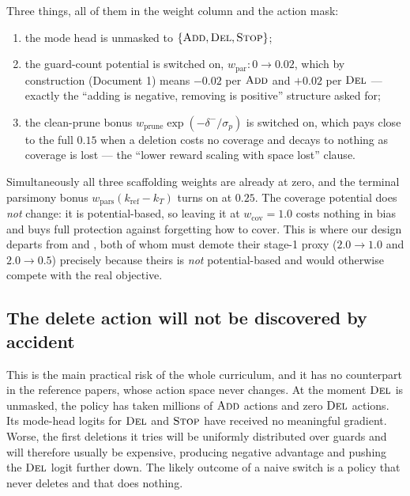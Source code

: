 \documentclass[11pt,a4paper]{article}
\begin{document}
Three things, all of them in the weight column and the action mask:

\begin{enumerate}[label=(\alph*)]
  \item the mode head is unmasked to $\{\textsc{Add}, \textsc{Del}, \textsc{Stop}\}$;
  \item the guard-count potential is switched on, $w_{\mathrm{par}}: 0 \to 0.02$, which by
        construction (Document 1) means $-0.02$ per $\textsc{Add}$ and $+0.02$ per $\textsc{Del}$ --- exactly
        the ``adding is negative, removing is positive'' structure asked for;
  \item the clean-prune bonus $w_{\mathrm{prune}}\exp(-\delta^{-}/\sigma_p)$ is switched on,
        which pays close to the full $0.15$ when a deletion costs no coverage and decays to
        nothing as coverage is lost --- the ``lower reward scaling with space lost'' clause.
\end{enumerate}

Simultaneously all three scaffolding weights are already at zero, and the terminal
parsimony bonus $w_{\mathrm{pars}}(k_{\mathrm{ref}} - k_T)$ turns on at $0.25$.
The coverage potential does \emph{not} change: it is potential-based, so leaving it at
$w_{\mathrm{cov}} = 1.0$ costs nothing in bias and buys full protection against forgetting
how to cover. This is where our design departs from \citet{wang2025dribble} and
\citet{xu2025striker}, both of whom must demote their stage-1 proxy ($2.0 \to 1.0$ and
$2.0 \to 0.5$) precisely because theirs is \emph{not} potential-based and would otherwise
compete with the real objective.

\subsection{The delete action will not be discovered by accident}\label{sec:oracle}

This is the main practical risk of the whole curriculum, and it has no counterpart in the
reference papers, whose action space never changes. At the moment $\textsc{Del}$ is unmasked, the
policy has taken millions of $\textsc{Add}$ actions and zero $\textsc{Del}$ actions. Its mode-head logits
for $\textsc{Del}$ and $\textsc{Stop}$ have received no meaningful gradient. Worse, the first deletions it
tries will be uniformly distributed over guards and will therefore usually be expensive,
producing negative advantage and pushing the $\textsc{Del}$ logit further down. The likely outcome
of a naive switch is a policy that never deletes and \stageII{} that does nothing.
\end{document}
